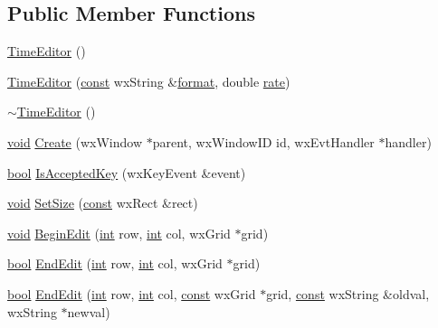 \subsection*{Public Member Functions}
\begin{DoxyCompactItemize}
\item 
\hyperlink{class_time_editor_a979a0a3d2e387200f32776f57840fe94}{Time\+Editor} ()
\item 
\hyperlink{class_time_editor_a92c9aa2314f675f37c0e775ad1b1f944}{Time\+Editor} (\hyperlink{getopt1_8c_a2c212835823e3c54a8ab6d95c652660e}{const} wx\+String \&\hyperlink{_export_p_c_m_8cpp_a317afff57d87a89158c2b038d37b2b08}{format}, double \hyperlink{seqread_8c_ad89d3fac2deab7a9cf6cfc8d15341b85}{rate})
\item 
\hyperlink{class_time_editor_a504feb40b3d468b8c5ea6270e1bbcdda}{$\sim$\+Time\+Editor} ()
\item 
\hyperlink{sound_8c_ae35f5844602719cf66324f4de2a658b3}{void} \hyperlink{class_time_editor_a1c787e9bf43bf78830e58e086a3cf029}{Create} (wx\+Window $\ast$parent, wx\+Window\+ID id, wx\+Evt\+Handler $\ast$handler)
\item 
\hyperlink{mac_2config_2i386_2lib-src_2libsoxr_2soxr-config_8h_abb452686968e48b67397da5f97445f5b}{bool} \hyperlink{class_time_editor_a081b456960b5f1510594a75d9648a619}{Is\+Accepted\+Key} (wx\+Key\+Event \&event)
\item 
\hyperlink{sound_8c_ae35f5844602719cf66324f4de2a658b3}{void} \hyperlink{class_time_editor_a4e2c5ec916b75717fa64e84f65000a1d}{Set\+Size} (\hyperlink{getopt1_8c_a2c212835823e3c54a8ab6d95c652660e}{const} wx\+Rect \&rect)
\item 
\hyperlink{sound_8c_ae35f5844602719cf66324f4de2a658b3}{void} \hyperlink{class_time_editor_af817bfb75790b50a79121778ea2de0fd}{Begin\+Edit} (\hyperlink{xmltok_8h_a5a0d4a5641ce434f1d23533f2b2e6653}{int} row, \hyperlink{xmltok_8h_a5a0d4a5641ce434f1d23533f2b2e6653}{int} col, wx\+Grid $\ast$grid)
\item 
\hyperlink{mac_2config_2i386_2lib-src_2libsoxr_2soxr-config_8h_abb452686968e48b67397da5f97445f5b}{bool} \hyperlink{class_time_editor_a2b7f6cf08a9e041d38ca5a8b7c2a0f94}{End\+Edit} (\hyperlink{xmltok_8h_a5a0d4a5641ce434f1d23533f2b2e6653}{int} row, \hyperlink{xmltok_8h_a5a0d4a5641ce434f1d23533f2b2e6653}{int} col, wx\+Grid $\ast$grid)
\item 
\hyperlink{mac_2config_2i386_2lib-src_2libsoxr_2soxr-config_8h_abb452686968e48b67397da5f97445f5b}{bool} \hyperlink{class_time_editor_a5c029b92ed4f16b4b3a9016e88735b40}{End\+Edit} (\hyperlink{xmltok_8h_a5a0d4a5641ce434f1d23533f2b2e6653}{int} row, \hyperlink{xmltok_8h_a5a0d4a5641ce434f1d23533f2b2e6653}{int} col, \hyperlink{getopt1_8c_a2c212835823e3c54a8ab6d95c652660e}{const} wx\+Grid $\ast$grid, \hyperlink{getopt1_8c_a2c212835823e3c54a8ab6d95c652660e}{const} wx\+String \&oldval, wx\+String $\ast$newval)

\end{DoxyCompactItemize}
